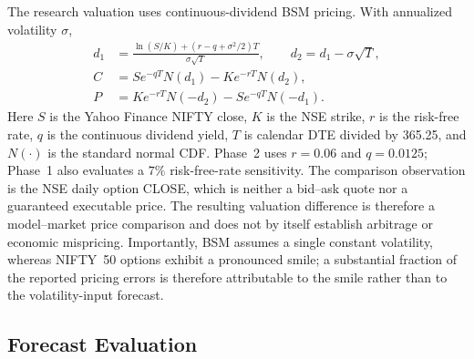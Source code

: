 \documentclass[journal]{IEEEtran}
\begin{document}
The research valuation uses continuous-dividend BSM pricing. With annualized volatility $\sigma$,
\begin{equation}
\begin{aligned}
d_1&=\frac{\ln(S/K)+(r-q+\sigma^2/2)T}{\sigma\sqrt T},\qquad d_2=d_1-\sigma\sqrt T,\\
C&=Se^{-qT}N(d_1)-Ke^{-rT}N(d_2),\\
P&=Ke^{-rT}N(-d_2)-Se^{-qT}N(-d_1).
\end{aligned}
\end{equation}
Here $S$ is the Yahoo Finance NIFTY close, $K$ is the NSE strike, $r$ is the risk-free rate, $q$ is the continuous dividend yield, $T$ is calendar DTE divided by 365.25, and $N(\cdot)$ is the standard normal CDF. Phase~2 uses $r=0.06$ and $q=0.0125$; Phase~1 also evaluates a $7\%$ risk-free-rate sensitivity. The comparison observation is the NSE daily option CLOSE, which is neither a bid--ask quote nor a guaranteed executable price. The resulting valuation difference is therefore a model--market price comparison and does not by itself establish arbitrage or economic mispricing. Importantly, BSM assumes a single constant volatility, whereas NIFTY~50 options exhibit a pronounced smile; a substantial fraction of the reported pricing errors is therefore attributable to the smile rather than to the volatility-input forecast.

\subsection{Forecast Evaluation}
\end{document}
